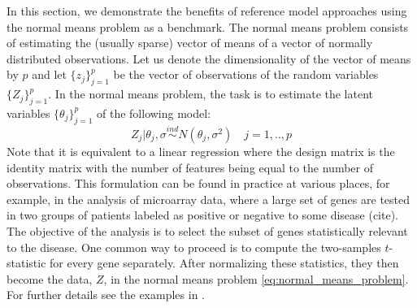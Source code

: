 \documentclass[american,]{article}
\theoremstyle{definition}
\begin{document}
In this section, we demonstrate the benefits of reference model approaches using the normal means problem as a benchmark. The normal means problem consists of estimating the (usually sparse) vector of means of a vector of normally distributed observations. Let us denote the dimensionality of the vector of means by $p$ and let $\{z_{j}\}_{j=1}^{p}$ be the vector of observations of the random variables $\{Z_{j}\}_{j=1}^{p}$. In the normal means problem, the task is to estimate the latent variables $\{\theta_{j}\}_{j=1}^{p}$ of the following model:
\
\begin{equation}\label{eq:normal_means_problem}
Z_{j}|\theta_{j},\sigma\overset{ind}{\sim}N(\theta_{j},\sigma^{2}) \quad j=1,..,p
\end{equation}
Note that it is equivalent to a linear regression where the design matrix is the identity matrix with the number of features being equal to the number of observations. This formulation can be found in practice at various places, 
for example, in the analysis of microarray data, where a large set of genes are tested in two groups of patients labeled as positive or negative to some disease (cite). The objective of the analysis is to select the subset of genes statistically relevant to the disease. One common way to proceed is to compute the two-samples $t$-statistic for every gene separately.
After normalizing these statistics, they then become the data, $Z$, in the normal means problem \eqref{eq:normal_means_problem}. For further details see the examples in \cite{paper:efron, efron2012large}. 
\end{document}
